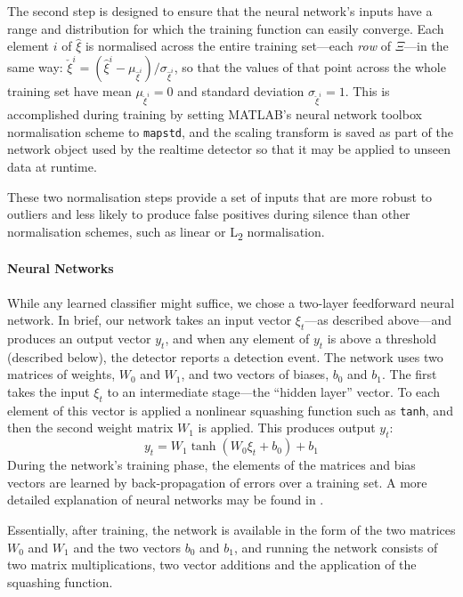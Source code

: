 \documentclass[10pt,letterpaper]{article}
\renewcommand{\subsubsection}[1]{\paragraph{#1}}
\begin{document}
The second step is designed to ensure that the neural network's inputs
have a range and distribution for which the training function can
easily converge.  Each element $i$ of $\hat{\xi}$ is normalised across
the entire training set---each {\em row} of $\Xi$---in the same way:
$\check{\xi}^i = (\hat{\xi}^i -
\mu_{\hat{\xi}^i})/\sigma_{\hat{\xi}^i}$, so that the values of that
point across the whole training set have mean $\mu_{\check{\xi}^i}=0$
and standard deviation $\sigma_{\check{\xi}^i}=1$.  This is
accomplished during training by setting MATLAB's neural network
toolbox normalisation scheme to {\tt mapstd}, and the scaling
transform is saved as part of the network object used by the realtime
detector so that it may be applied to unseen data at runtime.

These two normalisation steps provide a set of inputs that are more
robust to outliers and less likely to produce false positives during
silence than other normalisation schemes, such as linear or
L\textsubscript{2} normalisation.

\subsubsection{Neural Networks}

While any learned classifier might suffice, we chose a two-layer
feedforward neural network.  In brief, our network takes an input
vector $\xi_t$---as described above---and produces an output vector
$y_t$, and when any element of $y_t$ is above a threshold (described
below), the detector reports a detection event.  The network uses two
matrices of weights, $W_0$ and $W_1$, and two vectors of biases, $b_0$
and $b_1$.  The first takes the input $\xi_t$ to an intermediate
stage---the ``hidden layer'' vector.  To each element of this vector
is applied a nonlinear squashing function such as {\tt tanh}, and then
the second weight matrix $W_1$ is applied.  This produces output
$y_t$:
\begin{equation*}
  y_t = W_1 \tanh (W_0 \xi_t + b_0) + b_1
\end{equation*}
During the network's training phase, the elements of the matrices and bias vectors are learned by back-propagation of errors
over a training set.  A more detailed explanation of neural networks
may be found in \cite{hkp}.

Essentially, after training, the network is available in the form of
the two matrices $W_0$ and $W_1$ and the two vectors $b_0$ and $b_1$,
and running the network consists of two matrix multiplications, two
vector additions and the application of the squashing function.
\end{document}

